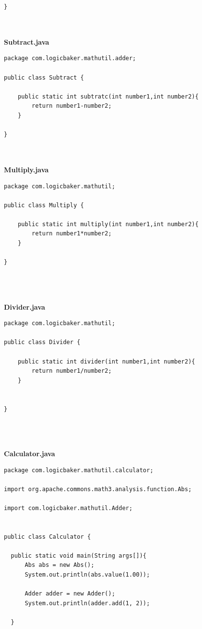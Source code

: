 \documentclass[12pt,a4paper,oneside]{report}
\begin{document}
{\begin{lstlisting}
}



\end{lstlisting}


\textbf{Subtract.java}
\begin{lstlisting}
package com.logicbaker.mathutil.adder;

public class Subtract {
	
	public static int subtratc(int number1,int number2){
		return number1-number2;
	}

}



\end{lstlisting}


\textbf{Multiply.java}
\begin{lstlisting}
package com.logicbaker.mathutil;

public class Multiply {
	
	public static int multiply(int number1,int number2){
		return number1*number2;
	}

}




\end{lstlisting}


\textbf{Divider.java}
\begin{lstlisting}
package com.logicbaker.mathutil;

public class Divider {
	
	public static int divider(int number1,int number2){
		return number1/number2;
	}
	

}




\end{lstlisting}


\textbf{Calculator.java}
\begin{lstlisting}
package com.logicbaker.mathutil.calculator;

import org.apache.commons.math3.analysis.function.Abs;

import com.logicbaker.mathutil.Adder;


public class Calculator {
	
  public static void main(String args[]){
	  Abs abs = new Abs();
	  System.out.println(abs.value(1.00));
	  
	  Adder adder = new Adder();
	  System.out.println(adder.add(1, 2));
	  
  }
  

\end{lstlisting}}
\end{document}
